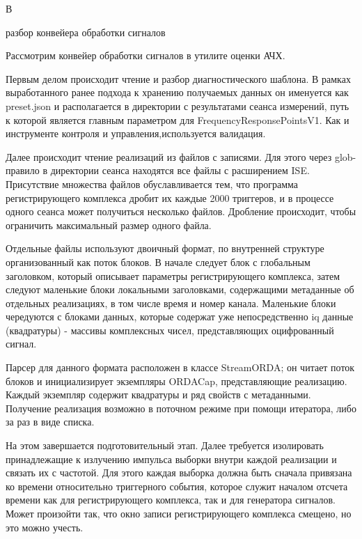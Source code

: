 \documentclass{report}
\begin{document}
\pagebreak
\begin{flushright}
     В
\end{flushright}

\begin{center}   разбор конвейера обработки сигналов \end{center}

Рассмотрим конвейер обработки сигналов в утилите оценки АЧХ.

Первым делом происходит чтение и разбор диагностического шаблона. В рамках выработанного ранее подхода к хранению получаемых данных он именуется как preset.json и располагается в директории с результатами сеанса измерений, путь к которой является главным параметром для FrequencyResponsePointsV1. Как и инструменте контроля и управления,используется валидация.

Далее происходит чтение реализаций из файлов с записями. Для этого через glob-правило в директории сеанса находятся все файлы с расширением ISE. Присутствие множества файлов обуславливается тем, что программа регистрирующего комплекса дробит их каждые 2000 триггеров, и в процессе одного сеанса может получиться несколько файлов. Дробление происходит, чтобы ограничить максимальный размер одного файла.

Отдельные файлы используют двоичный формат, по внутренней структуре организованный как поток блоков. В начале следует блок с глобальным заголовком, который описывает параметры регистрирующего комплекса, затем следуют маленькие блоки локальными заголовками, содержащими метаданные об отдельных реализациях, в том числе время и номер канала. Маленькие блоки чередуются с блоками данных, которые содержат уже непосредственно iq данные (квадратуры) - массивы комплексных чисел, представляющих оцифрованный сигнал.

Парсер для данного формата расположен в классе StreamORDA; он читает поток блоков и инициализирует экземпляры ORDACap, представляющие реализацию. Каждый экземпляр содержит квадратуры и ряд свойств с метаданными. Получение реализация возможно в поточном режиме при помощи итератора, либо за раз в виде списка.

На этом завершается подготовительный этап. Далее требуется изолировать принадлежащие к излучению импульса выборки внутри каждой реализации и связать их с частотой. Для этого каждая выборка должна быть сначала привязана ко времени относительно триггерного события, которое служит началом отсчета времени как для регистрирующего комплекса, так и для генератора сигналов. Может произойти так, что окно записи регистрирующего комплекса смещено, но это можно учесть.
\end{document}
